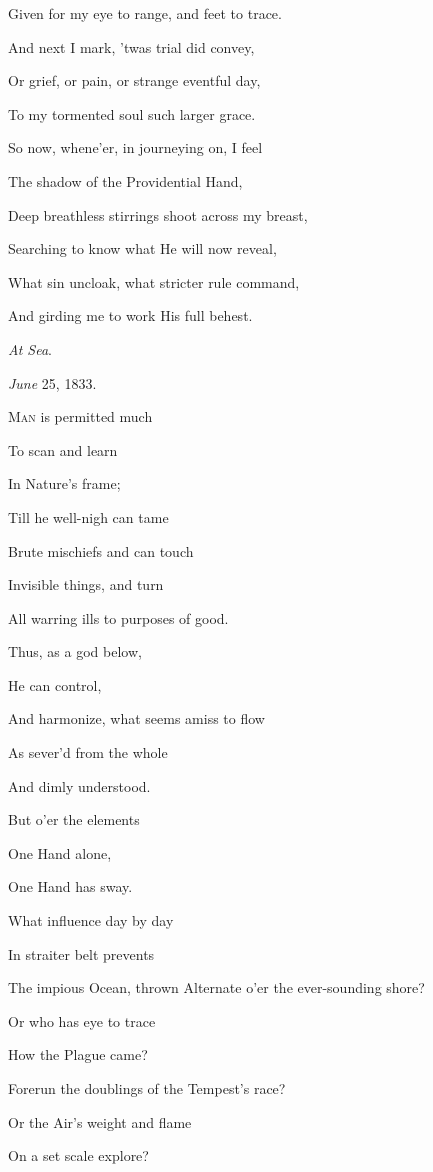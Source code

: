 Given for my eye to range, and feet to trace.

And next I mark, 'twas trial did convey,

Or grief, or pain, or strange eventful day,

To my tormented soul such larger grace.

So now, whene'er, in journeying on, I feel

The shadow of the Providential Hand,

Deep breathless stirrings shoot across my breast,

Searching to know what He will now reveal,

What sin uncloak, what stricter rule command,

And girding me to work His full behest.

\emph{At Sea}.

\emph{June} 25, 1833.


M\textsc{an} is permitted much

To scan and learn

In Nature's frame;

Till he well-nigh can tame

Brute mischiefs and can touch

Invisible things, and turn

All warring ills to purposes of good.

Thus, as a god below,

He can control,

And harmonize, what seems amiss to flow

As sever'd from the whole

And dimly understood.

But o'er the elements

One Hand alone,

One Hand has sway.

What influence day by day

In straiter belt prevents

The impious Ocean, thrown Alternate o'er the ever-sounding shore?

Or who has eye to trace

How the Plague came?

Forerun the doublings of the Tempest's race?

Or the Air's weight and flame

On a set scale explore?

